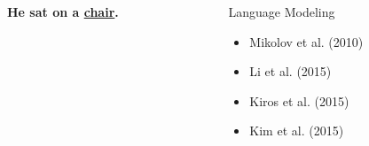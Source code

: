 \begin{frame}
    \begin{columns}            
        \begin{column}{0.6\textwidth}
            \begin{overlayarea}{\textwidth}{\textheight}
                \vspace{0.2in}
                \hspace{1cm}\textbf{He sat on a \underline{chair}.}
            \end{overlayarea}
        \end{column}
        \begin{column}{0.4\textwidth}
            \begin{overlayarea}{\textwidth}{\textheight}
                \begin{block}{Language Modeling}
                    \begin{itemize}
                    \item Mikolov et al. (2010)\cite{DBLP:conf/interspeech/MikolovKBCK10}
                    \item Li et al. (2015)  
                    \item Kiros et al. (2015)\cite{DBLP:conf/nips/KirosZSZUTF15}
                    \item Kim et al. (2015)\cite{DBLP:journals/corr/KimJSR15}
                    \end{itemize}
                \end{block}
            \end{overlayarea}
        \end{column}
    \end{columns}
\end{frame}

